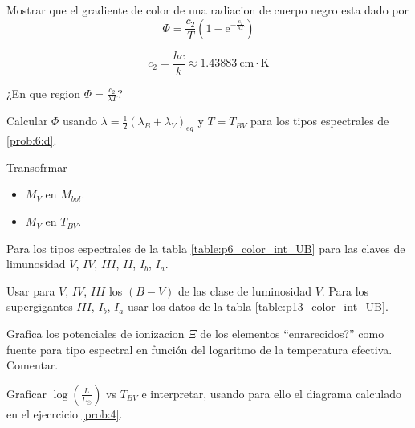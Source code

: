 \documentclass[12pt,a4paper]{practice}
\begin{document}
    \begin{problem}\label{prob:12}
        \begin{ppart}\label{prob:12:a}
            Mostrar que el gradiente de color de una radiacion de cuerpo negro esta dado por
            $$
                \Phi = \frac{c_2}{T}\left(1 - \mathrm{e}^{-\frac{c_2}{\lambda T}}\right)
            $$

            $$
                c_2 = \frac{hc}{k} \approx 1.43883\ \mathrm{cm \cdot K}
            $$
        \end{ppart}

        \begin{ppart}\label{prob:12:b}
            ¿En que region $\Phi = \frac{c_2}{\lambda T}$?
        \end{ppart}

        \begin{ppart}\label{prob:12:c}
            Calcular $\Phi$ usando $\lambda = \frac{1}{2}\left(\lambda_B + \lambda_V\right)_{eq}$ y $T = T_{BV}$ para los tipos espectrales de \ref{prob:6:d}.
        \end{ppart}
    \end{problem}

    \begin{problem}\label{prob:13}
        Transofrmar
            \begin{itemize}
                \item $M_{V}$ en $M_{bol}$.
                \item $M_{V}$ en $T_{BV}$.
            \end{itemize}

            Para los tipos espectrales de la tabla \ref{table:p6_color_int_UB} para las claves de limunosidad $V$, $IV$, $III$, $II$, $I_{b}$, $I_{a}$.

            Usar para $V$, $IV$, $III$ los $\left(B-V\right)$ de las clase de luminosidad $V$. Para los supergigantes $III$, $I_{b}$, $I_{a}$ usar los datos de la tabla \ref{table:p13_color_int_UB}.
    \end{problem}

    \begin{problem}\label{prob:14}
        Grafica los potenciales de ionizacion $\Xi$ de los elementos ``enrarecidos?'' como fuente para tipo espectral en función del logaritmo de la temperatura efectiva. Comentar.
    \end{problem}

    \begin{problem}\label{prob:15}
        \begin{ppart}\label{prob:15:B}
            Graficar $\log\left(\frac{L}{L_\odot}\right)$ vs $T_{BV}$ e interpretar, usando para ello el diagrama calculado en el ejecrcicio \ref{prob:4}.
        \end{ppart}
    \end{problem}
\end{document}
